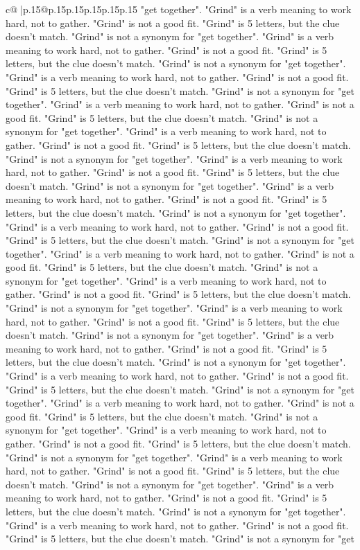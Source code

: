 \documentclass{article}
\begin{document}
{\begin{supertabular}{c@{$\;$}|p{.15\linewidth}@{}p{.15\linewidth}p{.15\linewidth}p{.15\linewidth}p{.15\linewidth}p{.15\linewidth}}
{{{"get together". "Grind" is a verb meaning to work hard, not to gather. "Grind" is not a good fit. "Grind" is 5 letters, but the clue doesn't match. "Grind" is not a synonym for "get together". "Grind" is a verb meaning to work hard, not to gather. "Grind" is not a good fit. "Grind" is 5 letters, but the clue doesn't match. "Grind" is not a synonym for "get together". "Grind" is a verb meaning to work hard, not to gather. "Grind" is not a good fit. "Grind" is 5 letters, but the clue doesn't match. "Grind" is not a synonym for "get together". "Grind" is a verb meaning to work hard, not to gather. "Grind" is not a good fit. "Grind" is 5 letters, but the clue doesn't match. "Grind" is not a synonym for "get together". "Grind" is a verb meaning to work hard, not to gather. "Grind" is not a good fit. "Grind" is 5 letters, but the clue doesn't match. "Grind" is not a synonym for "get together". "Grind" is a verb meaning to work hard, not to gather. "Grind" is not a good fit. "Grind" is 5 letters, but the clue doesn't match. "Grind" is not a synonym for "get together". "Grind" is a verb meaning to work hard, not to gather. "Grind" is not a good fit. "Grind" is 5 letters, but the clue doesn't match. "Grind" is not a synonym for "get together". "Grind" is a verb meaning to work hard, not to gather. "Grind" is not a good fit. "Grind" is 5 letters, but the clue doesn't match. "Grind" is not a synonym for "get together". "Grind" is a verb meaning to work hard, not to gather. "Grind" is not a good fit. "Grind" is 5 letters, but the clue doesn't match. "Grind" is not a synonym for "get together". "Grind" is a verb meaning to work hard, not to gather. "Grind" is not a good fit. "Grind" is 5 letters, but the clue doesn't match. "Grind" is not a synonym for "get together". "Grind" is a verb meaning to work hard, not to gather. "Grind" is not a good fit. "Grind" is 5 letters, but the clue doesn't match. "Grind" is not a synonym for "get together". "Grind" is a verb meaning to work hard, not to gather. "Grind" is not a good fit. "Grind" is 5 letters, but the clue doesn't match. "Grind" is not a synonym for "get together". "Grind" is a verb meaning to work hard, not to gather. "Grind" is not a good fit. "Grind" is 5 letters, but the clue doesn't match. "Grind" is not a synonym for "get together". "Grind" is a verb meaning to work hard, not to gather. "Grind" is not a good fit. "Grind" is 5 letters, but the clue doesn't match. "Grind" is not a synonym for "get together". "Grind" is a verb meaning to work hard, not to gather. "Grind" is not a good fit. "Grind" is 5 letters, but the clue doesn't match. "Grind" is not a synonym for "get together". "Grind" is a verb meaning to work hard, not to gather. "Grind" is not a good fit. "Grind" is 5 letters, but the clue doesn't match. "Grind" is not a synonym for "get together". "Grind" is a verb meaning to work hard, not to gather. "Grind" is not a good fit. "Grind" is 5 letters, but the clue doesn't match. "Grind" is not a synonym for "get together". "Grind" is a verb meaning to work hard, not to gather. "Grind" is not a good fit. "Grind" is 5 letters, but the clue doesn't match. "Grind" is not a synonym for "get }}}
\end{supertabular}}
\end{document}
